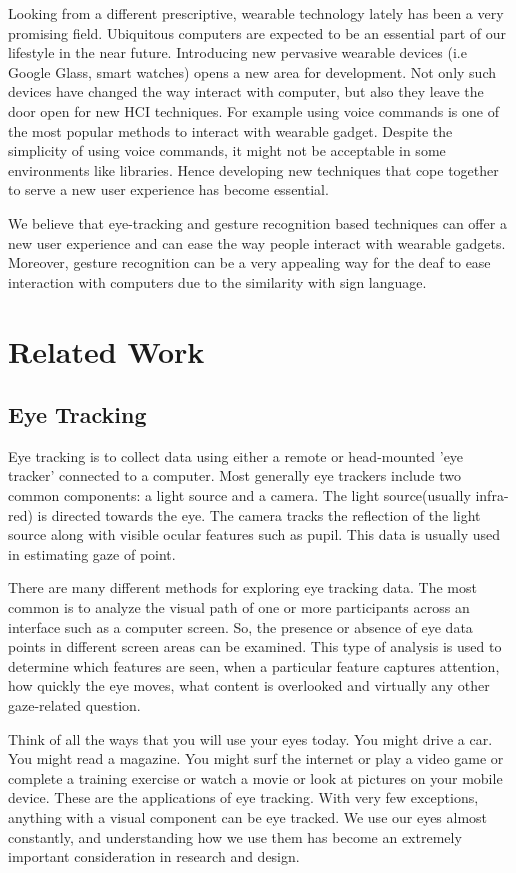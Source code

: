 Looking from a different prescriptive, wearable technology lately has been a very promising field. Ubiquitous computers are expected to be an essential part of our lifestyle in the near future. Introducing new pervasive wearable devices (i.e Google Glass, smart watches) opens a new area for development. Not only such devices have  changed the way interact with computer, but also they leave the door open for new HCI techniques. For example using voice commands is one of the most popular methods to interact with wearable gadget. Despite the simplicity of using voice commands, it might not be acceptable in some environments like libraries. Hence developing new techniques that cope together to serve a new user experience has become essential. \bigskip

We believe that eye-tracking and gesture recognition based techniques can offer a new user experience and can ease the way people interact with wearable gadgets. Moreover, gesture recognition can be a very appealing way for the deaf to ease interaction with computers due to the similarity with sign language. 


\section{Related Work}
\subsection{Eye Tracking} 
Eye tracking is to collect data using either a remote or head-mounted 'eye tracker' connected to a computer. Most generally eye trackers include two common components: a light source and a camera. The light source(usually infra-red) is directed towards the eye. The camera tracks the reflection of the light source along with visible ocular features such as pupil. This data is usually used in estimating gaze of point. \bigskip

There are many different methods for exploring eye tracking data. The most common is to analyze the visual path of one or more participants across an interface such as a computer screen. So, the presence or absence of eye data points in different screen areas can be examined. This type of analysis is used to determine which features are seen, when a particular feature captures attention, how quickly the eye moves, what content is overlooked and virtually any other gaze-related question. \bigskip

Think of all the ways that you will use your eyes today. You might drive a car. You might read a magazine. You might surf the internet or play a video game or complete a training exercise or watch a movie or look at pictures on your mobile device. These are the applications of eye tracking. With very few exceptions, anything with a visual component can be eye tracked. We use our eyes almost constantly, and understanding how we use them has become an extremely important consideration in research and design. \bigskip

